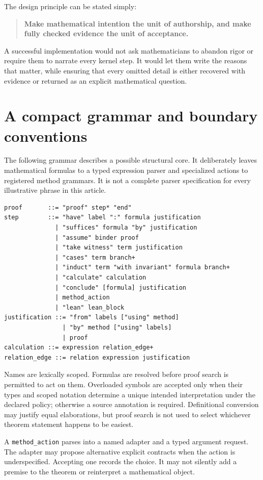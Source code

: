 \documentclass[11pt,a4paper]{article}
\newcommand{\code}[1]{\texttt{#1}}
\theoremstyle{remark}
\begin{document}
The design principle can be stated simply:
\begin{quote}
\textbf{Make mathematical intention the unit of authorship, and make fully checked evidence the unit of acceptance.}
\end{quote}
A successful implementation would not ask mathematicians to abandon rigor or require them to narrate every kernel step. It would let them write the reasons that matter, while ensuring that every omitted detail is either recovered with evidence or returned as an explicit mathematical question.

\appendix
\section{A compact grammar and boundary conventions}
\label{sec:grammar}

The following grammar describes a possible structural core. It deliberately leaves mathematical formulas to a typed expression parser and specialized actions to registered method grammars. It is not a complete parser specification for every illustrative phrase in this article.
\begin{lstlisting}
proof       ::= "proof" step* "end"
step        ::= "have" label ":" formula justification
              | "suffices" formula "by" justification
              | "assume" binder proof
              | "take witness" term justification
              | "cases" term branch+
              | "induct" term "with invariant" formula branch+
              | "calculate" calculation
              | "conclude" [formula] justification
              | method_action
              | "lean" lean_block
justification ::= "from" labels ["using" method]
                | "by" method ["using" labels]
                | proof
calculation ::= expression relation_edge+
relation_edge ::= relation expression justification
\end{lstlisting}

Names are lexically scoped. Formulas are resolved before proof search is permitted to act on them. Overloaded symbols are accepted only when their types and scoped notation determine a unique intended interpretation under the declared policy; otherwise a source annotation is required. Definitional conversion may justify equal elaborations, but proof search is not used to select whichever theorem statement happens to be easiest.

A \code{method\_action} parses into a named adapter and a typed argument request. The adapter may propose alternative explicit contracts when the action is underspecified. Accepting one records the choice. It may not silently add a premise to the theorem or reinterpret a mathematical object.
\end{document}
